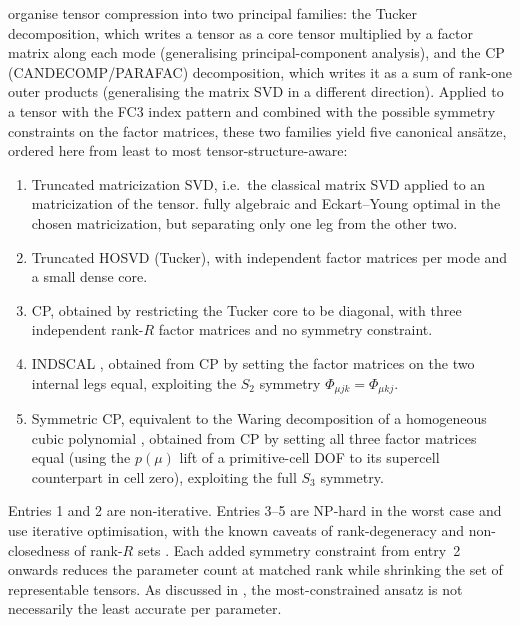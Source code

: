 \citet{kolda_tensor_2009} organise tensor compression into two principal families: the
Tucker decomposition, which writes a tensor as a core tensor multiplied by a factor matrix
along each mode (generalising principal-component analysis), and the CP
(CANDECOMP/PARAFAC) decomposition, which writes it as a sum of rank-one outer products
(generalising the matrix SVD in a different direction). Applied to a tensor with the FC3 index
pattern and combined with the possible symmetry constraints on the factor matrices, these two
families yield five canonical ans\"atze, ordered here from least to most
tensor-structure-aware:
\begin{enumerate}
  \item Truncated matricization SVD, i.e.\ the classical matrix SVD applied to an matricization of
        the tensor. fully algebraic and Eckart--Young optimal in the chosen matricization, but
        separating only one leg from the other two.
  \item Truncated HOSVD (Tucker), with independent factor matrices per mode and a small dense core.
  \item CP, obtained by restricting the Tucker core to be diagonal, with three
        independent rank-$R$ factor matrices and no symmetry constraint.
  \item INDSCAL \cite{carroll_analysis_1970}, obtained from CP by setting the
        factor matrices on the two internal legs equal, exploiting the
        $S_2$ symmetry $\Phi_{\mu j k} = \Phi_{\mu k j}$.
  \item Symmetric CP, equivalent to the Waring decomposition of a homogeneous
        cubic polynomial \cite{brachat_symmetric_2010, comon_symmetric_2008,
        oeding_eigenvectors_2013}, obtained from CP by setting all three factor
        matrices equal (using the $p(\mu)$ lift of a primitive-cell DOF to its
        supercell counterpart in cell zero), exploiting the full $S_3$
        symmetry.
\end{enumerate}
Entries 1 and 2 are non-iterative. Entries 3--5 are NP-hard in the worst case
\cite{hillar_most_2013} and use iterative optimisation, with the known caveats of
rank-degeneracy and non-closedness of rank-$R$ sets
\cite{stegeman_degeneracy_2006, de_silva_tensor_2008}. Each added symmetry constraint from
entry~2 onwards reduces the parameter count at matched rank while shrinking the set of
representable tensors. As discussed in %
, the most-constrained ansatz is not necessarily the least accurate per
parameter.


